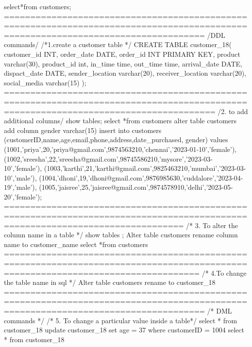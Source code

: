 select*from customers;
==================================================================================================================================
/DDL commands/
/*1.create a customer table */
CREATE TABLE customer_18(
 customer_id INT,
 order_date DATE,
 order_id INT PRIMARY KEY,
 product varchar(30),
 product_id int,
 in_time time,
 out_time time,
 arrival_date DATE,
 dispact_date DATE,
 sender_location varchar(20),
 receiver_location varchar(20),
 social_media varchar(15)
);
====================================================================================================================================
/2. to add additional columns/
show tables;
select *from customers
alter table customers add column gender varchar(15)
insert into customers (customerID,name,age,email,phone,address,date_purchased, gender) 
values
    (1001,'priya',20,'priya@gmail.com',9874563210,'chennai','2023-01-10','female'),
    (1002,'sreesha',22,'sreesha@gmail.com',98745586210,'mysore','2023-03-10','female'),
    (1003,'karthi',21,'karthi@gmail.com',9825463210,'mumbai','2023-03-10','male'),
    (1004,'dhoni',19,'dhoni@gmail.com',9876985630,'cuddalore','2023-04-19','male'),
    (1005,'jaisree',25,'jaisree@gmail.com',9874578910,'delhi','2023-05-20','female');
==============================================================================================================================
/* 3. To alter the column name in a table */
show tables ;
Alter table customers  rename column name to customer_name
select *from customers 
=================================================================================================================================
/* 4.To change the table name in sql */
 Alter table customers rename to customer_18
 ==================================================================================================================================
 /* DML commands */
/* 5. To change a particular value inside a table*/
select * from customer_18
update customer_18 set age = 37 where customerID = 1004
select * from customer_18